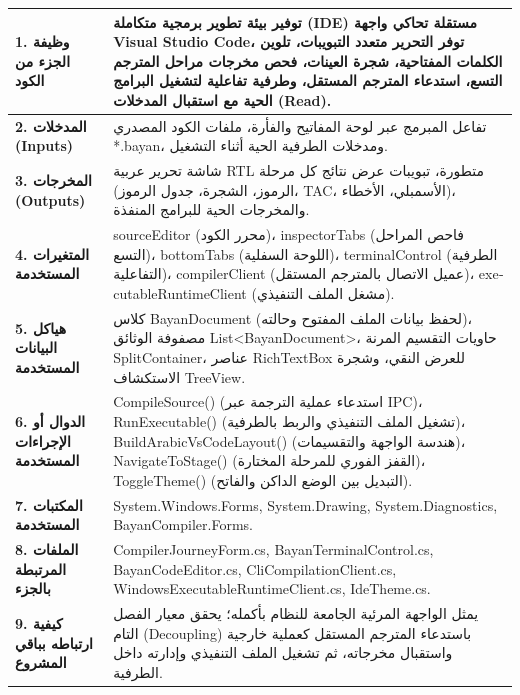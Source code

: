 \documentclass[12pt,a4paper]{report}
\begin{document}
\begin{tcolorbox}[colback=white,colframe=vscodeBlue!80!black,arc=2mm,title=\textbf{بطاقة المواصفات البرمجية لمحرر اللغة والطرفية (Language Editor \& Terminal Specification)}]
\begin{tabularx}{\linewidth}{p{4.2cm} X}
    \textbf{1. وظيفة الجزء من الكود} & توفير بيئة تطوير برمجية متكاملة (IDE) مستقلة تحاكي واجهة Visual Studio Code، توفر التحرير متعدد التبويبات، تلوين الكلمات المفتاحية، شجرة العينات، فحص مخرجات مراحل المترجم التسع، استدعاء المترجم المستقل، وطرفية تفاعلية لتشغيل البرامج الحية مع استقبال المدخلات (Read). \\
    \midrule
    \textbf{2. المدخلات (Inputs)} & تفاعل المبرمج عبر لوحة المفاتيح والفأرة، ملفات الكود المصدري \textenglish{*.bayan}، ومدخلات الطرفية الحية أثناء التشغيل. \\
    \midrule
    \textbf{3. المخرجات (Outputs)} & شاشة تحرير عربية RTL متطورة، تبويبات عرض نتائج كل مرحلة (الرموز، الشجرة، جدول الرموز، TAC، الأسمبلي، الأخطاء)، والمخرجات الحية للبرامج المنفذة. \\
    \midrule
    \textbf{4. المتغيرات المستخدمة} & \textenglish{sourceEditor} (محرر الكود)، \textenglish{inspectorTabs} (فاحص المراحل التسع)، \textenglish{bottomTabs} (اللوحة السفلية)، \textenglish{terminalControl} (الطرفية التفاعلية)، \textenglish{compilerClient} (عميل الاتصال بالمترجم المستقل)، \textenglish{executableRuntimeClient} (مشغل الملف التنفيذي). \\
    \midrule
    \textbf{5. هياكل البيانات المستخدمة} & كلاس \textenglish{BayanDocument} (لحفظ بيانات الملف المفتوح وحالته)، مصفوفة الوثائق \textenglish{List\textless BayanDocument\textgreater}، حاويات التقسيم المرنة \textenglish{SplitContainer}، عناصر \textenglish{RichTextBox} للعرض النقي، وشجرة الاستكشاف \textenglish{TreeView}. \\
    \midrule
    \textbf{6. الدوال أو الإجراءات المستخدمة} & \textenglish{CompileSource()} (استدعاء عملية الترجمة عبر IPC)، \textenglish{RunExecutable()} (تشغيل الملف التنفيذي والربط بالطرفية)، \textenglish{BuildArabicVsCodeLayout()} (هندسة الواجهة والتقسيمات)، \textenglish{NavigateToStage()} (القفز الفوري للمرحلة المختارة)، \textenglish{ToggleTheme()} (التبديل بين الوضع الداكن والفاتح). \\
    \midrule
    \textbf{7. المكتبات المستخدمة} & \textenglish{System.Windows.Forms, System.Drawing, System.Diagnostics, BayanCompiler.Forms}. \\
    \midrule
    \textbf{8. الملفات المرتبطة بالجزء} & \textenglish{CompilerJourneyForm.cs, BayanTerminalControl.cs, BayanCodeEditor.cs, CliCompilationClient.cs, WindowsExecutableRuntimeClient.cs, IdeTheme.cs}. \\
    \midrule
    \textbf{9. كيفية ارتباطه بباقي المشروع} & يمثل الواجهة المرئية الجامعة للنظام بأكمله؛ يحقق معيار الفصل التام (Decoupling) باستدعاء المترجم المستقل كعملية خارجية واستقبال مخرجاته، ثم تشغيل الملف التنفيذي وإدارته داخل الطرفية. \\
\end{tabularx}
\end{tcolorbox}
\end{document}
